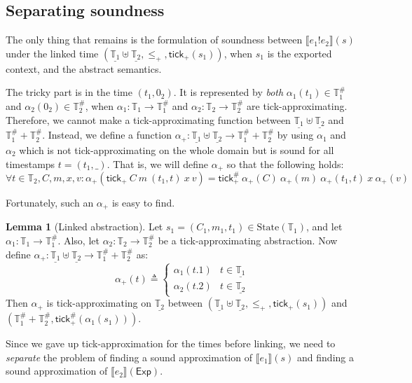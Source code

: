 \documentclass[acmsmall,review]{acmart}\settopmatter{printfolios=true,printccs=false,printacmref=false}
\theoremstyle{definition}
\newtheorem{lem}{Lemma}[section]
\newcommand*{\A}[1]{{#1}^{\#}}
\newcommand*{\Time}{\mathbb{T}}
\newcommand*{\ATime}{\A{\Time}}
\newcommand*{\mem}{m}
\newcommand*{\State}[1]{\text{State}({#1})}
\newcommand*{\link}[2]{{#1}\mathtt{!}{#2}}
\newcommand*{\Exp}{\mathsf{Exp}}
\newcommand*{\sembracket}[1]{\lBrack{#1}\rBrack}
\newcommand*{\tick}{\mathsf{tick}}
\begin{document}
\subsection{Separating soundness}
The only thing that remains is the formulation of soundness between $\sembracket{\link{e_1}{e_2}}(s)$ under the linked time $(\underline{\Time_1}\uplus\underline{\Time_2},\le_+,\tick_{+}(s_1))$, when $s_1$ is the exported context, and the abstract semantics.

The tricky part is in the time $(t_1,0_2)$.
It is represented by \emph{both} $\alpha_1(t_1)\in\ATime_1$ and $\alpha_2(0_2)\in\ATime_2$, when $\alpha_1:\Time_1\rightarrow\ATime_1$ and $\alpha_2:\Time_2\rightarrow\ATime_2$ are tick-approximating.
Therefore, we cannot make a tick-approximating function between $\underline{\Time_1}\uplus\underline{\Time_2}$ and $\ATime_1+\ATime_2$.
Instead, we define a function $\alpha_+:\underline{\Time_1}\uplus\underline{\Time_2}\rightarrow\ATime_1+\ATime_2$ by using $\alpha_1$ and $\alpha_2$ which is not tick-approximating on the whole domain but is sound for all timestamps $t=(t_1,\_)$.
That is, we will define $\alpha_+$ so that the following holds:
\[
  \forall t\in\Time_2,C,\mem,x,v:\alpha_+(\tick_+\:C\:\mem\:(t_1,t)\:x\:v)=\A\tick_+\:\alpha_+(C)\:\alpha_+(\mem)\:\alpha_+(t_1,t)\:x\:\alpha_+(v)
\]

Fortunately, such an $\alpha_+$ is easy to find.
\begin{lem}[Linked abstraction]
  Let $s_1=(C_1,\mem_1,t_1)\in\State{\Time_1}$, and let $\alpha_1:\Time_1\rightarrow\ATime_1$.
  Also, let $\alpha_2:\Time_2\rightarrow\ATime_2$ be a tick-approximating abstraction.
  Now define $\alpha_+:\underline{\Time_1}\uplus\underline{\Time_2}\rightarrow\ATime_1+\ATime_2$ as:
  \[
    \alpha_+(t)\triangleq
    \begin{cases}
      \alpha_1(t.1) & t\in\underline{\Time_1} \\
      \alpha_2(t.2) & t\in\underline{\Time_2}
    \end{cases}
  \]
  Then $\alpha_+$ is tick-approximating on $\underline{\Time_2}$ between $(\underline{\Time_1}\uplus\underline{\Time_2},\le_+,\tick_+(s_1))$ and $(\ATime_1+\ATime_2,\A\tick_+(\alpha_1(s_1)))$.
\end{lem}

Since we gave up tick-approximation for the times before linking, we need to \emph{separate} the problem of finding a sound approximation of $\sembracket{e_1}(s)$ and finding a sound approximation of $\sembracket{e_2}(\Exp)$.
\end{document}
